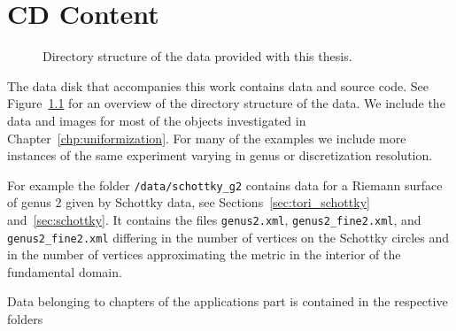 \documentclass[Thesis]{subfiles}
\begin{document}
\chapter{CD Content}
\label{chp:cd_content}

\begin{figure}
\vspace{0.2cm}
\caption{Directory structure of the data provided with this thesis.}
\label{fig:dir_structure}
\end{figure}

The data disk that accompanies this work contains data and source code. 
See Figure~\ref{fig:dir_structure} for an overview of the directory structure of the data. 
We include the data and images for most of the objects investigated in Chapter~\ref{chp:uniformization}. 
For many of the examples we include more instances of the same experiment varying in genus or discretization resolution.

For example the folder {\tt /data/schottky\_g2} contains data for a Riemann surface of genus $2$ given by Schottky data, see Sections~\ref{sec:tori_schottky} and~\ref{sec:schottky}. 
It contains the files {\tt genus2.xml}, {\tt genus2\_fine2.xml}, and {\tt genus2\_fine2.xml} differing in the number of vertices on the Schottky circles and in the number of vertices approximating the metric in the interior of the fundamental domain.

Data belonging to chapters of the applications part is contained in the respective folders 
\end{document}
